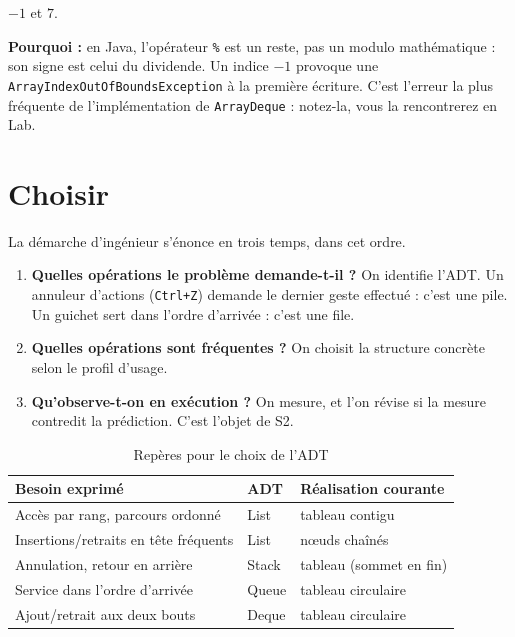 \documentclass[11pt,a4paper]{article}
\theoremstyle{definition}
\theoremstyle{remark}
\begin{document}
\begin{appliboxR}[Réponse]
$-1$ et $7$.

\textbf{Pourquoi :} en Java, l'opérateur \texttt{\%} est un reste, pas un
modulo mathématique : son signe est celui du dividende. Un indice $-1$
provoque une \texttt{ArrayIndexOutOfBoundsException} à la première écriture.
C'est l'erreur la plus fréquente de l'implémentation de \texttt{ArrayDeque} :
notez-la, vous la rencontrerez en Lab.
\end{appliboxR}

\section{Choisir}

La démarche d'ingénieur s'énonce en trois temps, dans cet ordre.

\begin{enumerate}
    \item \textbf{Quelles opérations le problème demande-t-il ?} On identifie
          l'ADT. Un annuleur d'actions (\texttt{Ctrl+Z}) demande le dernier
          geste effectué : c'est une pile. Un guichet sert dans l'ordre
          d'arrivée : c'est une file.
    \item \textbf{Quelles opérations sont fréquentes ?} On choisit la
          structure concrète selon le profil d'usage.
    \item \textbf{Qu'observe-t-on en exécution ?} On mesure, et l'on révise
          si la mesure contredit la prédiction. C'est l'objet de S2.
\end{enumerate}

\begin{table}[h!]
\centering
\caption{Repères pour le choix de l'ADT}
\begin{tabular}{lll}
\toprule
\textbf{Besoin exprimé} & \textbf{ADT} & \textbf{Réalisation courante} \\
\midrule
Accès par rang, parcours ordonné & List & tableau contigu \\
Insertions/retraits en tête fréquents & List & nœuds chaînés \\
Annulation, retour en arrière & Stack & tableau (sommet en fin) \\
Service dans l'ordre d'arrivée & Queue & tableau circulaire \\
Ajout/retrait aux deux bouts & Deque & tableau circulaire \\
\bottomrule
\end{tabular}
\end{table}
\end{document}
